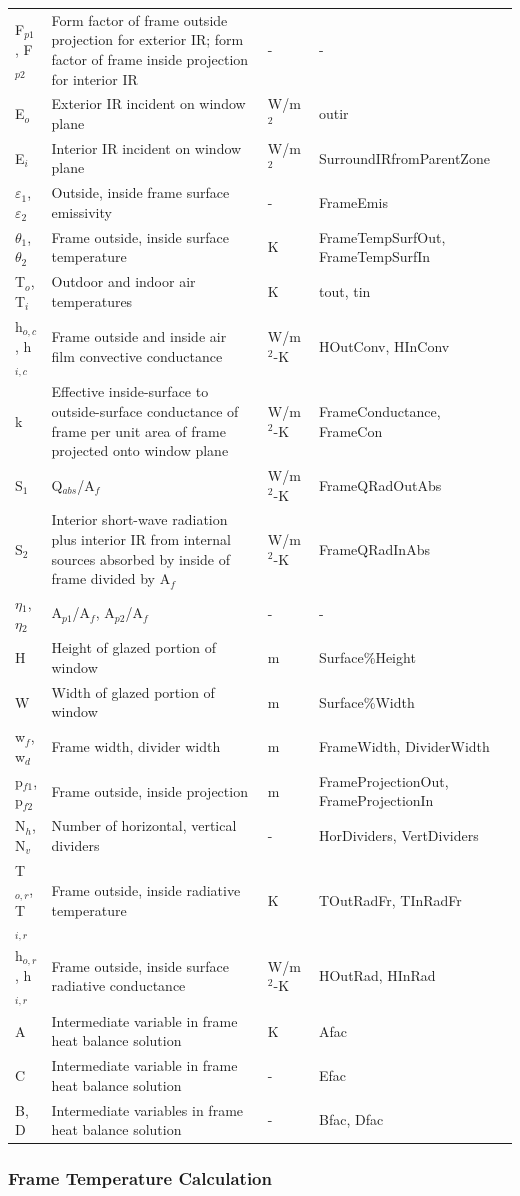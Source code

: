 \begin{longtable}[c]{p{1.0in}p{2.5in}p{1.0in}p{1.5in}}
F\(_{p1}\), F\(_{p2}\) & Form factor of frame outside projection for exterior IR; form factor of frame inside projection for interior IR & - & - \tabularnewline
E\(_{o}\) & Exterior IR incident on window plane & W/m\(^{2}\) & outir \tabularnewline
E\(_{i}\) & Interior IR incident on window plane & W/m\(^{2}\) & SurroundIRfromParentZone \tabularnewline
$\varepsilon$\(_{1}\), $\varepsilon$\(_{2}\) & Outside, inside frame surface emissivity & - & FrameEmis \tabularnewline
$\theta$\(_{1}\), $\theta$\(_{2}\) & Frame outside, inside surface temperature & K & FrameTempSurfOut, FrameTempSurfIn \tabularnewline
T\(_{o}\), T\(_{i}\) & Outdoor and indoor air temperatures & K & tout, tin \tabularnewline
h\(_{o,c}\), h\(_{i,c}\) & Frame outside and inside air film convective conductance & W/m\(^{2}\)-K & HOutConv, HInConv \tabularnewline
k & Effective inside-surface to outside-surface conductance of frame per unit area of frame projected onto window plane & W/m\(^{2}\)-K & FrameConductance, FrameCon \tabularnewline
S\(_{1}\) & Q\(_{abs}\)/A\(_{f}\) & W/m\(^{2}\)-K & FrameQRadOutAbs \tabularnewline
S\(_{2}\) & Interior short-wave radiation plus interior IR from internal sources absorbed by inside of frame divided by A\(_{f}\) & W/m\(^{2}\)-K & FrameQRadInAbs \tabularnewline
$\eta$\(_{1}\), $\eta$\(_{2}\) & A\(_{p1}\)/A\(_{f}\), A\(_{p2}\)/A\(_{f}\) & - & - \tabularnewline
H & Height of glazed portion of window & m & Surface\%Height \tabularnewline
W & Width of glazed portion of window & m & Surface\%Width \tabularnewline
w\(_{f}\), w\(_{d}\) & Frame width, divider width & m & FrameWidth, DividerWidth \tabularnewline
p\(_{f1}\), p\(_{f2}\) & Frame outside, inside projection & m & FrameProjectionOut, FrameProjectionIn \tabularnewline
N\(_{h}\), N\(_{v}\) & Number of horizontal, vertical dividers & - & HorDividers, VertDividers \tabularnewline
T\(_{o,r}\), T\(_{i,r}\) & Frame outside, inside radiative temperature & K & TOutRadFr, TInRadFr \tabularnewline
h\(_{o,r}\), h\(_{i,r}\) & Frame outside, inside surface radiative conductance & W/m\(^{2}\)-K & HOutRad, HInRad \tabularnewline
A & Intermediate variable in frame heat balance solution & K & Afac \tabularnewline
C & Intermediate variable in frame heat balance solution & - & Efac \tabularnewline
B, D & Intermediate variables in frame heat balance solution & - & Bfac, Dfac \tabularnewline
\bottomrule
\end{longtable}

\subsubsection{Frame Temperature Calculation}\label{frame-temperature-calculation}

